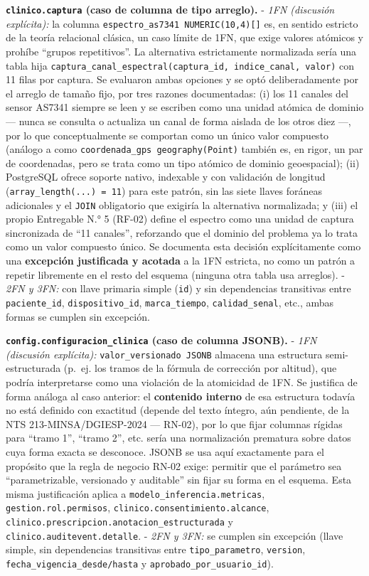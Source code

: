 \documentclass[11pt,a4paper]{article}
\begin{document}
\textbf{\texttt{clinico.captura} (caso de columna de tipo arreglo).}
- \emph{1FN (discusión explícita):} la columna \texttt{espectro\_as7341\ NUMERIC(10,4){[}{]}} es, en sentido estricto de la teoría relacional clásica, un caso límite de 1FN, que exige valores atómicos y prohíbe ``grupos repetitivos''. La alternativa estrictamente normalizada sería una tabla hija \texttt{captura\_canal\_espectral(captura\_id,\ indice\_canal,\ valor)} con 11 filas por captura. Se evaluaron ambas opciones y se optó deliberadamente por el arreglo de tamaño fijo, por tres razones documentadas: (i) los 11 canales del sensor AS7341 siempre se leen y se escriben como una unidad atómica de dominio --- nunca se consulta o actualiza un canal de forma aislada de los otros diez ---, por lo que conceptualmente se comportan como un único valor compuesto (análogo a como \texttt{coordenada\_gps\ geography(Point)} también es, en rigor, un par de coordenadas, pero se trata como un tipo atómico de dominio geoespacial); (ii) PostgreSQL ofrece soporte nativo, indexable y con validación de longitud (\texttt{array\_length(...)\ =\ 11}) para este patrón, sin las siete llaves foráneas adicionales y el \texttt{JOIN} obligatorio que exigiría la alternativa normalizada; y (iii) el propio Entregable N.° 5 (RF-02) define el espectro como una unidad de captura sincronizada de ``11 canales'', reforzando que el dominio del problema ya lo trata como un valor compuesto único. Se documenta esta decisión explícitamente como una \textbf{excepción justificada y acotada} a la 1FN estricta, no como un patrón a repetir libremente en el resto del esquema (ninguna otra tabla usa arreglos).
- \emph{2FN y 3FN:} con llave primaria simple (\texttt{id}) y sin dependencias transitivas entre \texttt{paciente\_id}, \texttt{dispositivo\_id}, \texttt{marca\_tiempo}, \texttt{calidad\_senal}, etc., ambas formas se cumplen sin excepción.

\textbf{\texttt{config.configuracion\_clinica} (caso de columna JSONB).}
- \emph{1FN (discusión explícita):} \texttt{valor\_versionado\ JSONB} almacena una estructura semi-estructurada (p.~ej. los tramos de la fórmula de corrección por altitud), que podría interpretarse como una violación de la atomicidad de 1FN. Se justifica de forma análoga al caso anterior: el \textbf{contenido interno} de esa estructura todavía no está definido con exactitud (depende del texto íntegro, aún pendiente, de la NTS 213-MINSA/DGIESP-2024 --- RN-02), por lo que fijar columnas rígidas para ``tramo 1'', ``tramo 2'', etc. sería una normalización prematura sobre datos cuya forma exacta se desconoce. JSONB se usa aquí exactamente para el propósito que la regla de negocio RN-02 exige: permitir que el parámetro sea ``parametrizable, versionado y auditable'' sin fijar su forma en el esquema. Esta misma justificación aplica a \texttt{modelo\_inferencia.metricas}, \texttt{gestion.rol.permisos}, \texttt{clinico.consentimiento.alcance}, \texttt{clinico.prescripcion.anotacion\_estructurada} y \texttt{clinico.auditevent.detalle}.
- \emph{2FN y 3FN:} se cumplen sin excepción (llave simple, sin dependencias transitivas entre \texttt{tipo\_parametro}, \texttt{version}, \texttt{fecha\_vigencia\_desde/hasta} y \texttt{aprobado\_por\_usuario\_id}).
\end{document}
